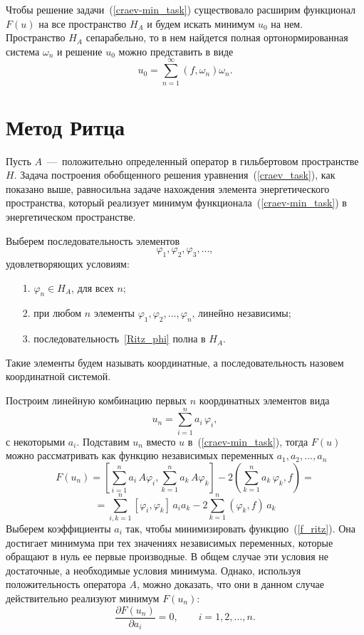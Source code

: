 \documentclass[12pt, a4paper]{article}
\begin{document}
Чтобы решение задачи~(\ref{craev-min_task}) существовало расширим функционал $F(u)$ на все пространство $H_A$ и будем искать минимум $u_0$ на нем.
Пространство $H_A$ сепарабельно, то в нем найдется полная ортонормированная система $\omega_n$ и решение $u_0$ можно представить в виде
\begin{equation}
	\label{craev_ser}
	u_0 = \sum\limits_{n = 1}^{\infty} (f, \omega_n)\omega_n.
\end{equation}

\section{Метод Ритца}
Пусть $A$~---~положительно определенный оператор в гильбертовом  пространстве $H$. Задача построения обобщенного решения уравнения~(\ref{craev_task}),
как показано выше, равносильна задаче нахождения элемента энергетического
пространства, который реализует минимум функционала~(\ref{craev-min_task})
в энергетическом пространстве.

Выберем последовательность элементов
\begin{equation}\label{Ritz_phi}
	\varphi_1, \varphi_2, \varphi_3, \ldots,
\end{equation}
удовлетворяющих условиям:
\begin{itemize}
	\item [1.] $\varphi_n \in H_A$, для всех $n$;
	\item [2.] при любом $n$ элементы $\varphi_1, \varphi_2,  \ldots, \varphi_n$, линейно независимы;
	\item [3.] последовательность~\eqref{Ritz_phi} полна в $H_A$.
\end{itemize}
Такие элементы будем называть координатные, а последовательность назовем координатной системой.

Построим линейную комбинацию первых $n$ координатных элементов вида
\begin{equation}\label{Ritz_un_sum}
	u_n = \sum_{i = 1}^n a_i \, \varphi_i,
\end{equation}
с некоторыми $a_i$. Подставим $u_n$ вместо $u$ в~(\ref{craev-min_task}), тогда $F(u)$ можно рассматривать как функцию
независимых переменных $a_1, a_2, \ldots, a_n$
\begin{equation}
	\label{f_ritz}
	F(u_n) = \left[\sum_{i = 1}^n a_i \, A\varphi_i,
	\sum_{k = 1}^n a_k \, A\varphi_k \right] -
	2\left(\sum_{k = 1}^n a_k \, \varphi_k, f \right) =
\end{equation}
\[
	= \sum_{i,k = 1}^n [\varphi_i, \varphi_k] \, a_i a_k -
	2\sum_{k = 1}^n (\varphi_k, f) \, a_k
\]
Выберем коэффициенты $a_i$ так, чтобы минимизировать функцию~(\ref{f_ritz}). Она достигает минимума при тех значениях независимых переменных, которые обращают в нуль ее первые производные. В общем случае эти условия не достаточные, а необходимые условия минимума. Однако, используя положительность оператора $A$, можно доказать, что они в данном случае действительно реализуют минимум $F(u_n)$:
\[
	\frac{\partial F(u_n)}{\partial a_i} = 0, \qquad i = 1, 2, \ldots, n.
\]
\end{document}
